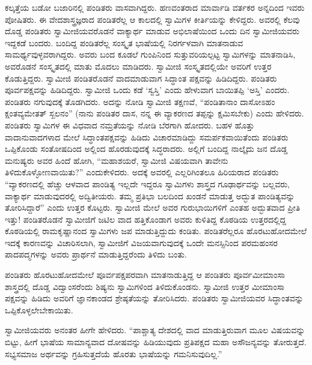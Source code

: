  ಕಲ್ಕತ್ತೆಯ ಬಡೋ ಬಜಾರಿನಲ್ಲಿ ಪಂಡಿತರು ವಾಸವಾಗಿದ್ದರು. ಹಣವಂತರಾದ ಮಾರ್ವಾಡಿ ವರ್ತಕರ ಅನ್ನದಿಂದ ಇವರು ಪೋಷಿತರು. ಈ ವೇದಶಾಸ್ತ್ರಜ್ಞರಾದ ಪಂಡಿತರೆಲ್ಲ ಆ ಕಾಲದಲ್ಲಿ ಸ್ವಾಮಿಗಳ ಕೀರ್ತಿಯನ್ನು ಕೇಳಿದ್ದರು. ಅವರಲ್ಲಿ ಕೆಲವು ದೊಡ್ಡ ಪಂಡಿತರು ಸ್ವಾಮೀಜಿಯವರೊಡನೆ ವಾಕ್ಯಾರ್ಥ ಮಾಡುವ ಅಭಿಲಾಷೆಯಿಂದ ಒಂದು ದಿನ ಸ್ವಾಮೀಜಿಯವರು ಇದ್ದಕಡೆ ಬಂದರು. ಬಂದಿದ್ದ ಪಂಡಿತರೆಲ್ಲ ಸಂಸ್ಕೃತ ಭಾಷೆಯಲ್ಲಿ ನಿರರ್ಗಳವಾಗಿ ಮಾತನಾಡುವ ಸಾಮರ್ಥ್ಯವುಳ್ಳವರಾಗಿದ್ದರು. ಅವರು ಬಂದ ಕೂಡಲೆ ಗುಂಪಿನಿಂದ ಸುತ್ತುವರಿಯಲ್ಪಟ್ಟ ಸ್ವಾಮಿಗಳನ್ನು ಮಾತನಾಡಿಸಿ, ಅವರೊಡನೆ ಸಂಸ್ಕೃತದಲ್ಲಿ ಮಾತು ಮೊದಲು ಮಾಡಿದರು. ಸ್ವಾಮೀಜಿ ಸಂಸ್ಕೃತದಲ್ಲಿಯೇ ಅವರಿಗೆ ಉತ್ತರ ಕೊಡುತ್ತಿದ್ದರು. ಸ್ವಾಮೀಜಿ ಪಂಡಿತರೊಡನೆ ವಾದಮಾಡುವಾಗ ಸಿದ್ಧಾಂತ ಪಕ್ಷವನ್ನು ಹಿಡಿದಿದ್ದರು. ಪಂಡಿತರು ಪೂರ್ವಪಕ್ಷವನ್ನು ಹಿಡಿದಿದ್ದರು. ಸ್ವಾಮೀಜಿ ಒಂದು ಕಡೆ ‘ಸ್ವಸ್ತಿ’ ಎಂದು ಹೇಳುವಾಗ ಬಾಯಿತಪ್ಪಿ ‘ಅಸ್ತಿ’ ಎಂದರು. ಪಂಡಿತರು ನಗುವುದಕ್ಕೆ ತೊಡಗಿದರು. ಅದನ್ನು ನೋಡಿ ಸ್ವಾಮೀಜಿ ತಕ್ಷಣವೆ, “ಪಂಡಿತಾನಾಂ ದಾಸೋಽಹಂ ಕ್ಷಂತವ್ಯಮೇತತ್ ಸ್ಖಲನಂ” (ನಾನು ಪಂಡಿತರ ದಾಸ, ನನ್ನ ಈ ವ್ಯಾಕರಣದ ತಪ್ಪನ್ನು ಕ್ಷಮಿಸಬೇಕು) ಎಂದು ಹೇಳಿದರು. ಪಂಡಿತರು ಸ್ವಾಮಿಗಳ ಈ ವಿಧವಾದ ನಮ್ರತೆಯನ್ನು ನೋಡಿ ಬೆರಗಾಗಿ ಹೋದರು. ಬಹಳ ಹೊತ್ತು ವಾದಾನುವಾದಗಳಾದ ಮೇಲೆ ಸಿದ್ಧಾಂತಪಕ್ಷವನ್ನು ಹಿಡಿದು ವಿಚಾರಮಾಡಿದ್ದು ಸಮರ್ಪಕವಾಯಿತೆಂದು ಪಂಡಿತರು ಒಪ್ಪಿಕೊಂಡು ಸಂತೋಷದಿಂದ ಅಲ್ಲಿಂದ ಹೊರಡುವುದಕ್ಕೆ ಸಿದ್ಧರಾದರು. ಅಲ್ಲಿಗೆ ಬಂದಿದ್ದ ನಾಲ್ಕೈದು ಜನ ದೊಡ್ಡ ಮನುಷ್ಯರು ಅವರ ಹಿಂದೆ ಹೋಗಿ, “ಮಹಾಶಯರೆ, ಸ್ವಾಮೀಜಿ ವಿಷಯವಾಗಿ ತಾವೇನು ತಿಳಿದುಕೊಳ್ಳೋಣವಾಯಿತು?” ಎಂದು\break ಕೇಳಿದರು. ಅದಕ್ಕೆ ಅವರಲ್ಲಿ ಎಲ್ಲರಿಗಿಂತಲೂ ಹಿರಿಯರಾದ ಪಂಡಿತರು “ವ್ಯಾಕರಣದಲ್ಲಿ ಹೆಚ್ಚು ಆಳವಾದ ಪಾಂಡಿತ್ಯ ಇಲ್ಲದೇ ಇದ್ದರೂ ಸ್ವಾಮಿಗಳು ಶಾಸ್ತ್ರದ ಗೂಢಾರ್ಥವನ್ನು ಬಲ್ಲವರು, ವಾಕ್ಯಾರ್ಥ ಮಾಡುವುದರಲ್ಲಿ ಅದ್ವಿತೀಯರು. ತಮ್ಮ ಪ್ರತಿಭಾ ಬಲದಿಂದ ಖಂಡನೆ ಮಾಡುತ್ತ ಅದ್ಭುತ ಪಾಂಡಿತ್ಯವನ್ನು ತೋರಿಸಿದ್ದಾರೆ” ಎಂದು ಉತ್ತರ ಕೊಟ್ಟರು. ಸ್ವಾಮೀಜಿ ಮೇಲೆ ಅವರ ಗುರುಭಾಯಿಗಳಿಗೆ ಎಂತಹ ಅದ್ಭುತವಾದ ಪ್ರೀತಿ ಇತ್ತು! ಪಂಡಿತರೊಡನೆ ಸ್ವಾಮೀಜಿಗೆ ಜಟಿಲ ವಾದ ಹತ್ತಿಕೊಂಡಾಗ ಅವರು ಕುಳಿತಿದ್ದ ಕೊಠಡಿಯ ಉತ್ತರದಲ್ಲಿದ್ದ ಕೊಠಡಿಯಲ್ಲಿ ರಾಮಕೃಷ್ಣಾನಂದ ಸ್ವಾಮಿಗಳು ಜಪ ಮಾಡುತ್ತಿದ್ದುದು ಕಂಡಿತು. ಪಂಡಿತರೆಲ್ಲರೂ ಹೊರಟುಹೋದಮೇಲೆ ಇದಕ್ಕೆ ಕಾರಣವನ್ನು ವಿಚಾರಿಸಲಾಗಿ, ಸ್ವಾಮೀಜಿಗೆ ವಿಜಯವಾಗುವುದಕ್ಕೆ ಒಂದೇ ಮನಸ್ಸಿನಿಂದ ಪರಮಹಂಸರ ಪಾದಪದ್ಮಗಳನ್ನು ಅವರು ಪ್ರಾರ್ಥನೆ ಮಾಡುತ್ತಿದ್ದರೆಂದು ತಿಳಿದು ಬಂತು. 

 ಪಂಡಿತರು ಹೊರಟುಹೋದಮೇಲೆ ಪೂರ್ವಪಕ್ಷಪರವಾಗಿ ಮಾತನಾಡುತ್ತಿದ್ದ ಆ ಪಂಡಿತರು ಪೂರ್ವಮೀಮಾಂಸಾ ಶಾಸ್ತ್ರದಲ್ಲಿ ದೊಡ್ಡ ವಿದ್ವಾಂಸರೆಂದು ಶಿಷ್ಯನು ಸ್ವಾಮಿಗಳಿಂದ ತಿಳಿದುಕೊಂಡನು. ಸ್ವಾಮೀಜಿ ಉತ್ತರ ಮೀಮಾಂಸಾ ಪಕ್ಷವನ್ನು ಹಿಡಿದು ಅವರಿಗೆ ಜ್ಞಾನಕಾಂಡದ ಶ್ರೇಷ್ಠತೆಯನ್ನು ತೋರಿಸಿದರು. ಪಂಡಿತರು ಸ್ವಾಮೀಜಿಯವರ ಸಿದ್ಧಾಂತವನ್ನು ಒಪ್ಪಿಕೊಳ್ಳಲೇಬೇಕಾಯಿತು. 

 ಸ್ವಾಮೀಜಿಯವರು ಅನಂತರ ಹೀಗೇ ಹೇಳಿದರು. “ಪಾಶ್ಚಾತ್ಯ ದೇಶದಲ್ಲಿ ವಾದ ಮಾಡುತ್ತಿರುವಾಗ ಮೂಲ ವಿಷಯವನ್ನು ಬಿಟ್ಟು, ಹೀಗೆ ಭಾಷೆಯ ಸಾಮಾನ್ಯವಾದ ದೋಷವನ್ನು ಹಿಡಿಯುವುದು ಪ್ರತಿಪಕ್ಷದ ಮಹಾ ಅಸೌಜನ್ಯವನ್ನು ತೋರುತ್ತದೆ. ಸಭ್ಯಸಮಾಜ ಅರ್ಥವನ್ನು ಗ್ರಹಿಸುತ್ತದೆಯೆ ಹೊರತು ಭಾಷೆಯನ್ನು ಗಮನಿಸುವುದಿಲ್ಲ.” 

